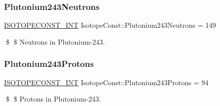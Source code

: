 \subsubsection{\texorpdfstring{Plutonium243\+Neutrons}{Plutonium243Neutrons}}
{\footnotesize\ttfamily \mbox{\hyperlink{group___isotope_const-_macros_ga5f18360b3e99483a35c32d789e62621c}{I\+S\+O\+T\+O\+P\+E\+C\+O\+N\+S\+T\+\_\+\+I\+NT}} Isotope\+Const\+::\+Plutonium243\+Neutrons = 149}

\$ \$ Neutrons in Plutonium-\/243. \mbox{\label{group___isotope_const-_plutonium-_pu243_gafa2868ce0f0487d255ef51e43454e8db}} 
\subsubsection{\texorpdfstring{Plutonium243\+Protons}{Plutonium243Protons}}
{\footnotesize\ttfamily \mbox{\hyperlink{group___isotope_const-_macros_ga5f18360b3e99483a35c32d789e62621c}{I\+S\+O\+T\+O\+P\+E\+C\+O\+N\+S\+T\+\_\+\+I\+NT}} Isotope\+Const\+::\+Plutonium243\+Protons = 94}

\$ \$ Protons in Plutonium-\/243. 